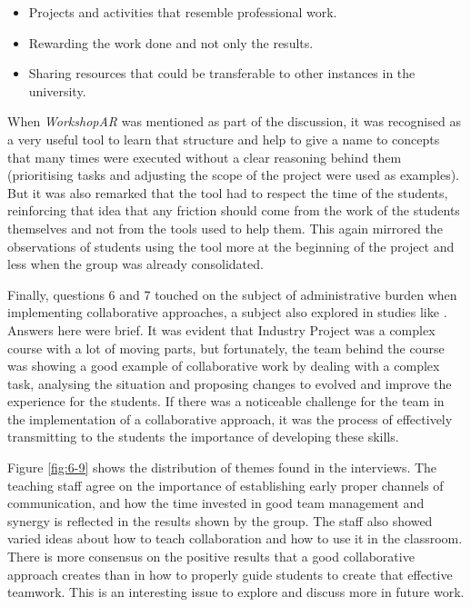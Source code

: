 \begin{itemize}
    \item Projects and activities that resemble professional work.
    \item Rewarding the work done and not only the results.
    \item Sharing resources that could be transferable to other instances in the university.
\end{itemize}

When \emph{WorkshopAR} was mentioned as part of the discussion, it was recognised as a very useful tool to learn that structure and help to give a name to concepts that
many times were executed without a clear reasoning behind them (prioritising tasks and adjusting the scope of the project were used as examples). But it was also remarked
that the tool had to respect the time of the students, reinforcing that idea that any friction should come from the work of the students themselves and not from the tools
used to help them. This again mirrored the observations of students using the tool more at the beginning of the project and less when the group was already consolidated.

Finally, questions 6 and 7 touched on the subject of administrative burden when implementing collaborative approaches, a subject also explored in studies like \textcite{le_2018,kaendler_2015,hendry_2003}.
Answers here were brief. It was evident that Industry Project was a complex course with a lot of moving parts, but fortunately, the team behind the course was showing a
good example of collaborative work by dealing with a complex task, analysing the situation and proposing changes to evolved and improve the experience for the students.
If there was a noticeable challenge for the team in the implementation of a collaborative approach, it was the process of effectively transmitting to the students the
importance of developing these skills.

Figure \ref{fig:6-9} shows the distribution of themes found in the interviews. The teaching staff agree on the importance of establishing early proper channels of communication, and how
the time invested in good team management and synergy is reflected in the results shown by the group. The staff also showed varied ideas about how to teach collaboration and how to use it
in the classroom. There is more consensus on the positive results that a good collaborative approach creates than in how to properly guide students to create that effective teamwork. This
is an interesting issue to explore and discuss more in future work.

